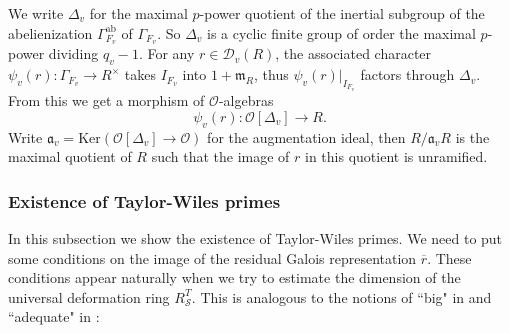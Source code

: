 \documentclass[12pt,oneside,reqno]{amsart}
\theoremstyle{plain}
\begin{document}
	
	We write
	$\Delta_v$
	for the maximal $p$-power quotient of the
	inertial subgroup of the abelienization
	$\Gamma_{F_v}^\mathrm{ab}$ of
	$\Gamma_{F_v}$.
	So $\Delta_v$ is a cyclic finite group of order the maximal $p$-power dividing
	$q_v-1$.
	For any $r\in\mathcal{D}_v(R)$,
	the associated character
	$\psi_v(r)
	\colon
	\Gamma_{F_v}
	\rightarrow
	R^\times$
	takes $I_{F_v}$ into
	$1+\mathfrak{m}_R$,
	thus
	$\psi_v(r)|_{I_{F_v}}$
	factors through $\Delta_v$.
	From this we get a morphism of
	$\mathcal{O}$-algebras
	\begin{equation}\label{a character of the universal deformation ring}
		\psi_v(r)
		\colon
		\mathcal{O}[\Delta_v]
		\rightarrow
		R.
	\end{equation}
	Write
	$\mathfrak{a}_v
	=
	\mathrm{Ker}
	(\mathcal{O}[\Delta_v]
	\rightarrow
	\mathcal{O})$
	for the augmentation ideal,
	then
	$R/\mathfrak{a}_vR$
	is the maximal quotient of $R$ such that
	the image of $r$ in this quotient is unramified.
	
	
	\subsubsection{Existence of Taylor-Wiles primes}
	In this subsection we show the existence
	of Taylor-Wiles primes.
	We need to put some conditions on the image
	of the residual Galois representation
	$\overline{r}$.
	These conditions appear naturally when we try to
	estimate the dimension of
	the universal deformation ring
	$R_\mathcal{S}^T$.
	This is analogous to
	the notions of ``big" in
	\cite[Definition 2.5.1]{ClozelHarrisTaylor2008}
	and
	``adequate" in
	\cite[Definition 2.3]{Thorne2012}:
	
\end{document}
